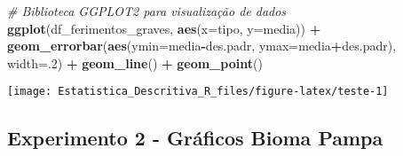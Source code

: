 \documentclass[portuguese,]{article}
\newenvironment{Shaded}{\begin{snugshade}}{\end{snugshade}}
\newcommand{\KeywordTok}[1]{\textcolor[rgb]{0.13,0.29,0.53}{\textbf{#1}}}
\newcommand{\DataTypeTok}[1]{\textcolor[rgb]{0.13,0.29,0.53}{#1}}
\newcommand{\DecValTok}[1]{\textcolor[rgb]{0.00,0.00,0.81}{#1}}
\newcommand{\StringTok}[1]{\textcolor[rgb]{0.31,0.60,0.02}{#1}}
\newcommand{\CommentTok}[1]{\textcolor[rgb]{0.56,0.35,0.01}{\textit{#1}}}
\newcommand{\OperatorTok}[1]{\textcolor[rgb]{0.81,0.36,0.00}{\textbf{#1}}}
\newcommand{\NormalTok}[1]{#1}
\begin{document}
\begin{Shaded}
\begin{Highlighting}[]
\CommentTok{# Biblioteca GGPLOT2 para visualização de dados}
\KeywordTok{ggplot}\NormalTok{(df_ferimentos_graves, }\KeywordTok{aes}\NormalTok{(}\DataTypeTok{x=}\NormalTok{tipo, }\DataTypeTok{y=}\NormalTok{media)) }\OperatorTok{+}\StringTok{ }
\StringTok{  }\KeywordTok{geom_errorbar}\NormalTok{(}\KeywordTok{aes}\NormalTok{(}\DataTypeTok{ymin=}\NormalTok{media}\OperatorTok{-}\NormalTok{des.padr, }\DataTypeTok{ymax=}\NormalTok{media}\OperatorTok{+}\NormalTok{des.padr), }\DataTypeTok{width=}\NormalTok{.}\DecValTok{2}\NormalTok{) }\OperatorTok{+}
\StringTok{  }\KeywordTok{geom_line}\NormalTok{() }\OperatorTok{+}
\StringTok{  }\KeywordTok{geom_point}\NormalTok{()}
\end{Highlighting}
\end{Shaded}

\begin{center}\texttt{[image: Estatistica\_Descritiva\_R\_files/figure-latex/teste-1]} \end{center}

\subsection{Experimento 2 - Gráficos Bioma
Pampa}\label{experimento-2---graficos-bioma-pampa}
\end{document}
